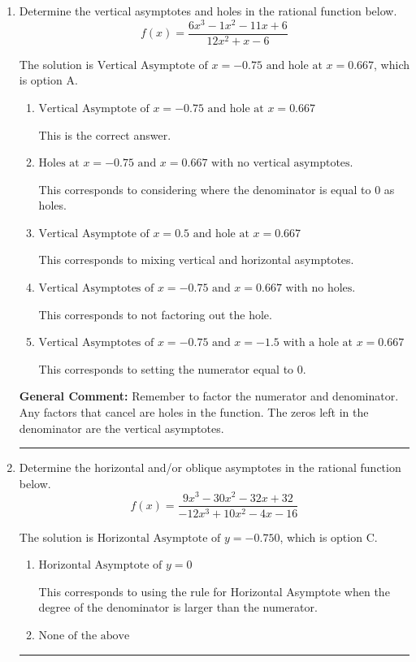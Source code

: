 \documentclass{extbook}[14pt]
\newcommand{\litem}[1]{\item #1

\rule{\textwidth}{0.4pt}}
\begin{document}
\begin{enumerate}\litem{
Determine the vertical asymptotes and holes in the rational function below.
\[ f(x) = \frac{6x^{3} -1 x^{2} -11 x + 6}{12x^{2} +x -6} \]

The solution is \( \text{Vertical Asymptote of } x = -0.75 \text{ and hole at } x = 0.667 \), which is option A.\begin{enumerate}[label=\Alph*.]
\item \( \text{Vertical Asymptote of } x = -0.75 \text{ and hole at } x = 0.667 \)

This is the correct answer.
\item \( \text{Holes at } x = -0.75 \text{ and } x = 0.667 \text{ with no vertical asymptotes.} \)

This corresponds to considering where the denominator is equal to 0 as holes.
\item \( \text{Vertical Asymptote of } x = 0.5 \text{ and hole at } x = 0.667 \)

This corresponds to mixing vertical and horizontal asymptotes.
\item \( \text{Vertical Asymptotes of } x = -0.75 \text{ and } x = 0.667 \text{ with no holes.} \)

This corresponds to not factoring out the hole.
\item \( \text{Vertical Asymptotes of } x = -0.75 \text{ and } x = -1.5 \text{ with a hole at } x = 0.667 \)

This corresponds to setting the numerator equal to 0.
\end{enumerate}

\textbf{General Comment:} Remember to factor the numerator and denominator. Any factors that cancel are holes in the function. The zeros left in the denominator are the vertical asymptotes.
}
\litem{
Determine the horizontal and/or oblique asymptotes in the rational function below.
\[ f(x) = \frac{9x^{3} -30 x^{2} -32 x + 32}{-12x^{3} +10 x^{2} -4 x -16} \]

The solution is \( \text{Horizontal Asymptote of } y = -0.750  \), which is option C.\begin{enumerate}[label=\Alph*.]
\item \( \text{Horizontal Asymptote of } y = 0  \)

This corresponds to using the rule for Horizontal Asymptote when the degree of the denominator is larger than the numerator.
\item \( \text{None of the above} \)


\end{enumerate}}
\end{enumerate}
\end{document}
